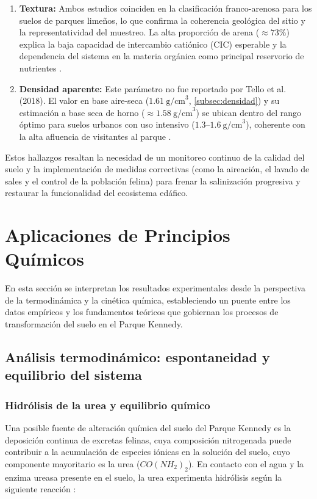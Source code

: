 \documentclass[fleqn]{jaes}
\begin{document}
\begin{enumerate}
  \item \textbf{Textura:} Ambos estudios coinciden en la clasificación franco-arenosa para los suelos de parques limeños, lo que confirma la coherencia geológica del sitio y la representatividad del muestreo. La alta proporción de arena ($\approx 73\%$) explica la baja capacidad de intercambio catiónico (CIC) esperable y la dependencia del sistema en la materia orgánica como principal reservorio de nutrientes \cite{Bilen2025}.

  \item \textbf{Densidad aparente:} Este parámetro no fue reportado por Tello et al. (2018). El valor en base aire-seca ($1.61~\text{g/cm}^3$, \cref{subsec:densidad}) y su estimación a base seca de horno ($\approx 1.58~\text{g/cm}^3$) se ubican dentro del rango óptimo para suelos urbanos con uso intensivo ($1.3$--$1.6~\text{g/cm}^3$), coherente con la alta afluencia de visitantes al parque \cite{Patterson1977}.
\end{enumerate}

Estos hallazgos resaltan la necesidad de un monitoreo continuo de la calidad del suelo y la implementación de medidas correctivas (como la aireación, el lavado de sales y el control de la población felina) para frenar la salinización progresiva y restaurar la funcionalidad del ecosistema edáfico.

\section{Aplicaciones de Principios Químicos}\label{sec:aplicaciones}

En esta sección se interpretan los resultados experimentales desde la perspectiva de la termodinámica y la cinética química, estableciendo un puente entre los datos empíricos y los fundamentos teóricos que gobiernan los procesos de transformación del suelo en el Parque Kennedy.

\subsection{Análisis termodinámico: espontaneidad y equilibrio del sistema}

\subsubsection{Hidrólisis de la urea y equilibrio químico}

Una posible fuente de alteración química del suelo del Parque Kennedy es la deposición continua de excretas felinas, cuya composición nitrogenada puede contribuir a la acumulación de especies iónicas en la solución del suelo, cuyo componente mayoritario es la urea ($CO(NH_2)_2$). En contacto con el agua y la enzima ureasa presente en el suelo, la urea experimenta hidrólisis según la siguiente reacción \cite{FertilizarEquipo}:
\end{document}
